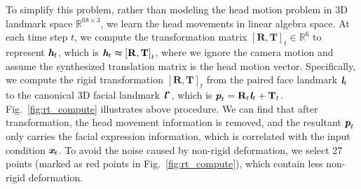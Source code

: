 \documentclass[runningheads]{llncs}
\def\mathbi#1{\textbf{\em #1}}
\begin{document}
To simplify this problem, rather than modeling the head motion problem in 3D landmark space $\mathbb{R}^{68 \times 3}$, we learn the head movements in linear algebra space. At each time step $t$, we compute the transformation matrix $[\mathbf{R},\mathbf{T}]_t \in \mathbb{R}^{6}$  to represent $\mathbi{h}_{t}$, which is ${\mathbi{h}}_{t} \thickapprox [{\mathbf{R}},{\mathbf{T}]}_{t}$,
where we ignore the camera motion and assume the synthesized translation matrix is the head motion vector.
Specifically, we compute the rigid transformation $[\mathbf{R},\mathbf{T}]_t$ from the paired face landmark $\mathbi{l}_t$ to the canonical 3D facial landmark $\mathbi{l}^*$, which is ${\mathbi{p}}_t = \mathbf{R}_t   \mathbi{l}_t + \mathbf{T}_t$. Fig.~\ref{fig:rt_compute} illustrates above procedure. We can find that after transformation, the head movement information is removed, and the resultant ${\mathbi{p}}_t$ only carries the facial expression information, which is correlated with the input condition $\mathbi{x}_t$. To avoid the noise caused by non-rigid deformation, we select 27 points (marked as red points in Fig.~\ref{fig:rt_compute}), which contain less non-rigid deformation.
 
\end{document}
